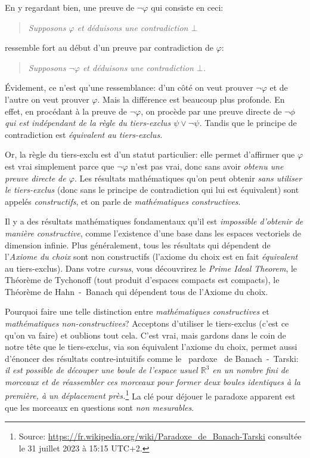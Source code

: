 \documentclass[french,course,oneside,theoremnosection]{lecture}
\newenvironment{further}[1]
{\begin{tcolorbox}[colframe=gray!50, colback=gray!5, arc=0pt, outer arc=0pt, boxrule=0.5pt, title=#1, breakable]}
{\end{tcolorbox}}
\begin{document}
\begin{further}{Preuve de la négation et principe de contradiction}
En y regardant bien, une preuve de $\neg \varphi$ qui consiste en ceci:
\begin{quotation}\itshape
Supposons $\varphi$ et déduisons une contradiction $\bot$
\end{quotation}
ressemble fort au début d'un preuve par  contradiction de $\varphi$:
\begin{quotation}\itshape
Supposons $\neg \varphi$ et déduisons une contradiction $\bot$.
\end{quotation}
Évidement, ce n'est qu'une ressemblance: d'un côté on veut prouver $\neg \varphi$ et de l'autre on veut prouver $\varphi$. Mais la différence est beaucoup plus profonde. En effet, en procédant à la preuve de $\neg \varphi$, on procède par une preuve directe de $\neg \phi$ \emph{qui est indépendant de la règle du tiers-exclus $\psi \vee \neg \psi$.} Tandis que le principe de contradiction est \emph{équivalent au tiers-exclus.}
\smallskip

Or, la règle du tiers-exclu est d'un statut particulier: elle permet d'affirmer que $\varphi$ est vrai simplement parce que $\neg \varphi$ n'est pas vrai, donc sans avoir \emph{obtenu une preuve directe de $\varphi$}. Les résultats mathématiques qu'on peut obtenir \emph{sans utiliser le tiers-exclus} (donc sans le principe de contradiction qui lui est équivalent) sont appelés \emph{constructifs}, et on parle de \emph{mathématiques constructives}. 
\smallskip

Il y a des résultats mathématiques fondamentaux qu'il est \emph{impossible d'obtenir de manière constructive}, comme l'existence d'une base dans les espaces vectoriels de dimension infinie. Plus généralement, tous les résultats qui dépendent de l'\emph{Axiome du choix} sont non constructifs (l'axiome du choix est en fait \emph{équivalent} au tiers-exclus). Dans votre \emph{cursus}, vous découvrirez le \emph{Prime Ideal Theorem}, le Théorème de Tychonoff (tout produit d'espaces compacts est compacts), le Théorème de Hahn~-~Banach qui dépendent tous de l'Axiome du choix. 
\smallskip

Pourquoi faire une telle distinction entre \emph{mathématiques constructives} et \emph{mathématiques non-constructives}? Acceptons d'utiliser le tiers-exclus (c'est ce qu'on va faire) et oublions tout cela. C'est vrai, mais gardons dans le coin de notre tête que le tiers-exclus, via son équivalent l'axiome du choix, permet aussi d'énoncer des résultats contre-intuitifs comme le \og~pardoxe~\fg{} de Banach~-~Tarski: \emph{il est possible de découper une boule de l'espace usuel $\mathbb{R}^{3}$ en un nombre fini de morceaux et de réassembler ces morceaux pour former deux boules identiques à la première, à un déplacement près.}\footnote{Source: \url{https://fr.wikipedia.org/wiki/Paradoxe_de_Banach-Tarski} consultée le 31 juillet 2023 à 15:15 UTC+2.} La clé pour déjouer le paradoxe apparent est que les morceaux en questions sont \emph{non mesurables}.
\end{further}
\end{document}
